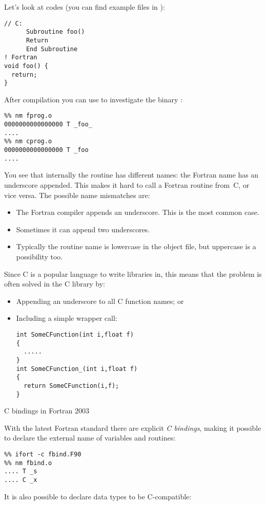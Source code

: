 Let's look at codes (you can find example files in ):
\begin{verbatim}
// C:
      Subroutine foo()
      Return
      End Subroutine
! Fortran
void foo() {
  return;
}
\end{verbatim}
After compilation you can use 
 to investigate the binary :
\begin{verbatim}
%% nm fprog.o
0000000000000000 T _foo_
....
%% nm cprog.o
0000000000000000 T _foo
....
\end{verbatim}
You see that internally the  routine has different names:
the Fortran name has an underscore appended. This makes
it hard to call a Fortran routine from~C, or vice versa.
The possible name mismatches are:
\begin{itemize}
\item The Fortran compiler appends an underscore. This is the most common case.
\item Sometimes it can append two underscores.
\item Typically the routine name is lowercase in the object file, but uppercase
      is a possibility too.
\end{itemize}

Since C is a popular language to write libraries in, this means
that the problem is often solved in the C library by:
\begin{itemize}
\item Appending an underscore to all C function names; or
\item Including a simple wrapper call:
\begin{verbatim}
int SomeCFunction(int i,float f)
{
  .....
}
int SomeCFunction_(int i,float f)
{
  return SomeCFunction(i,f);
}
\end{verbatim}
\end{itemize}

 {C bindings in Fortran 2003}
 
With the latest Fortran standard there are explicit
\emph{C bindings},
making
it possible to declare the
external name of variables and routines:

\begin{verbatim}
%% ifort -c fbind.F90
%% nm fbind.o
.... T _s
.... C _x
\end{verbatim}

It is also possible to declare data types to be C-compatible:


